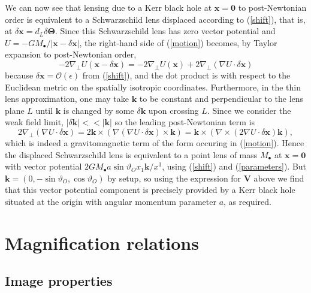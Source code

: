 \documentclass[prd,12pt,a4paper,showpacs]{revtex4}
\def\t{\Theta}
\begin{document}
We can now see that lensing due to a Kerr black hole at 
$\mathbf{x}=\mathbf{0}$ to post-Newtonian order is equivalent 
to a Schwarzschild lens displaced according to (\ref{shift}), that is, 
at $\delta \mathbf{x}=d_L\delta \boldsymbol{\t}$.
Since this Schwarzschild lens has zero vector potential 
and $U=-GM_\bullet/|\mathbf{x}-\delta\mathbf{x}|$, 
the right-hand side of (\ref{motion}) becomes, 
by Taylor expansion to post-Newtonian order,
\[
-2\nabla_\perp U(\mathbf{x}-\delta \mathbf{x})
= -2\nabla_\perp U(\mathbf{x})+2\nabla_\perp 
(\nabla U \cdot \delta \mathbf{x})
\]
because $\delta\mathbf{x}=\mathcal{O}(\epsilon)$ from (\ref{shift}), and the 
dot product is with respect to the Euclidean metric on the spatially isotropic coordinates. 
Furthermore, in the thin lens approximation, one may take $\mathbf{k}$ to be 
constant and perpendicular to the lens plane $L$ until $\mathbf{k}$ is 
changed by some $\delta\mathbf{k}$ upon crossing $L$. Since we 
consider the weak field limit, $|\delta\mathbf{k}|<<|\mathbf{k}|$ so the 
leading post-Newtonian term is
\[
2\nabla_\perp (\nabla U \cdot \delta \mathbf{x})=
2\mathbf{k}\times(\nabla(\nabla U \cdot \delta \mathbf{x})\times \mathbf{k})
= \mathbf{k}\times (\nabla \times (2\nabla U \cdot \delta \mathbf{x})\mathbf{k}),
\] 
which is indeed a gravitomagnetic term of the form occuring in (\ref{motion}). 
Hence the displaced Schwarzschild lens is equivalent to a point lens of mass $M_\bullet$ at $\mathbf{x}=\mathbf{0}$ with vector potential 
$2GM_\bullet a\sin \vartheta_O x_1\mathbf{k}/x^3$, using (\ref{shift}) and (\ref{parameters}). 
But $\mathbf{k}=(0,-\sin\vartheta_O,\cos\vartheta_O)$ by setup, so using the expression 
for $\mathbf{V}$ above we find that this vector potential component is precisely provided by a Kerr black hole situated at 
the origin with angular momentum parameter $a$, as required.

\section{Magnification relations}
\subsection{Image properties}
\end{document}
